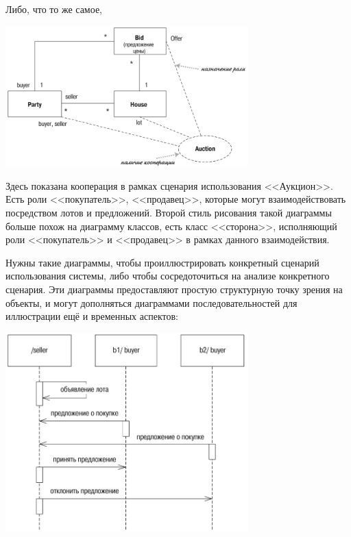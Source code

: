 \documentclass{../mcstext}
\begin{document}
Либо, что то же самое,

\begin{center}
    \includegraphics[width=0.7\textwidth]{cooperationAlternateNotation.png}
\end{center}

Здесь показана кооперация в рамках сценария использования <<Аукцион>>. Есть роли <<покупатель>>, <<продавец>>, которые могут взаимодействовать посредством лотов и предложений. Второй стиль рисования такой диаграммы больше похож на диаграмму классов, есть класс <<сторона>>, исполняющий роли <<покупатель>> и <<продавец>> в рамках данного взаимодействия.

Нужны такие диаграммы, чтобы проиллюстрировать конкретный сценарий использования системы, либо чтобы сосредоточиться на анализе конкретного сценария. Эти диаграммы предоставляют простую структурную точку зрения на объекты, и могут дополняться диаграммами последовательностей для иллюстрации ещё и временных аспектов:

\begin{center}
    \includegraphics[width=0.7\textwidth]{cooperationSequenceDiagram.png}
\end{center}
\end{document}
